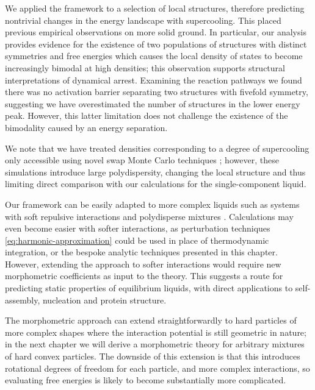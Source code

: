 \documentclass[11pt,twoside]{report}
\begin{document}
We applied the framework to a selection of local structures, therefore predicting nontrivial changes in the energy landscape with supercooling.
This placed previous empirical observations on more solid ground.
In particular, our analysis provides evidence for the existence of two populations of structures with distinct symmetries and free energies which causes the local density of states to become increasingly bimodal at high densities; this observation supports structural interpretations of dynamical arrest.
Examining the reaction pathways we found there was no activation barrier separating two structures with fivefold symmetry, suggesting we have overestimated the number of structures in the lower energy peak.
However, this latter limitation does not challenge the existence of the bimodality caused by an energy separation.

We note that we have treated densities corresponding to a degree of supercooling only accessible using novel swap Monte Carlo techniques \cite{BerthierPRL2016}; however, these simulations introduce large polydispersity, changing the local structure \cite{CoslovichJPCM2018} and thus limiting direct comparison with our calculations for the single-component liquid.

Our framework can be easily adapted to more complex liquids such as systems with soft repulsive interactions and polydisperse mixtures \cite{KodamaJCP2011}.
Calculations may even become easier with softer interactions, as perturbation techniques \eqref{eq:harmonic-approximation} could be used in place of thermodynamic integration, or the bespoke analytic techniques presented in this chapter.
However, extending the approach to softer interactions would require new morphometric coefficients as input to the theory.
This suggests a route for predicting static properties of equilibrium liquids, with direct applications to self-assembly, nucleation and protein structure.

The morphometric approach can extend straightforwardly to hard particles of more complex shapes where the interaction potential is still geometric in nature; in the next chapter we will derive a morphometric theory for arbitrary mixtures of hard convex particles.
The downside of this extension is that this introduces rotational degrees of freedom for each particle, and more complex interactions, so evaluating free energies is likely to become substantially more complicated.

\end{document}
